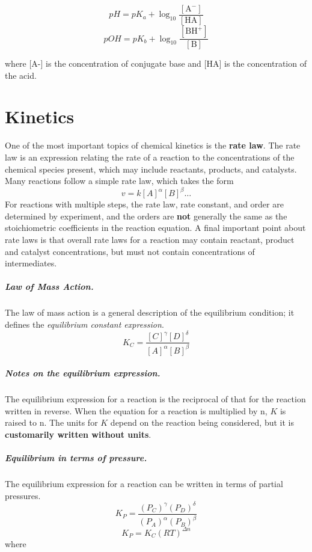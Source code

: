 \documentclass[oneside]{book} %
\theoremstyle{plain}
\begin{document}
\[pH = pK_a + \log_{10} \frac{[\text{A}^-]}{[\text{HA}]}\]
\[pOH = pK_b + \log_{10} \frac{[\text{BH}^+]}{[\text{B}]}\]

where [A-] is the concentration of conjugate base and [HA] is the concentration
of the acid.

\chapter{Kinetics}

One of the most important topics of chemical kinetics is the \textbf{rate law}.
The rate law is an expression relating the rate of a reaction to the
concentrations of the chemical species present, which may include reactants,
products, and catalysts. Many reactions follow a simple rate law, which takes
the form
\[v = k [A]^\alpha [B]^\beta \ldots\]
For reactions with multiple steps, the rate law, rate constant, and order are
determined by experiment, and the orders are \textbf{not} generally the same as
the stoichiometric coefficients in the reaction equation.  A final important
point about rate laws is that overall rate laws for a reaction may contain
reactant, product and catalyst concentrations, but must not contain
concentrations of intermediates.

\paragraph{Law of Mass Action.} The law of mass action is a general description
of the equilibrium condition; it defines the \textit{equilibrium constant
expression}.
\[K_C = \frac{[C]^\gamma [D]^\delta}{[A]^\alpha [B]^\beta}\]

\paragraph{Notes on the equilibrium expression.} The equilibrium expression for
a reaction is the reciprocal of that for the reaction written in reverse. When
the equation for a reaction is multiplied by n, \(K\) is raised to n.  The
units for \(K\) depend on the reaction being considered, but it is
\textbf{customarily written without units}.

\paragraph{Equilibrium in terms of pressure.} The equilibrium expression for a
reaction can be written in terms of partial pressures.
\[K_P = \frac{\left(P_C\right)^\gamma
\left(P_D\right)^\delta}{\left(P_A\right)^\alpha \left(P_B\right)^\beta}\]
\[K_P = K_C (RT)^{\Delta n}\]
where
\end{document}
